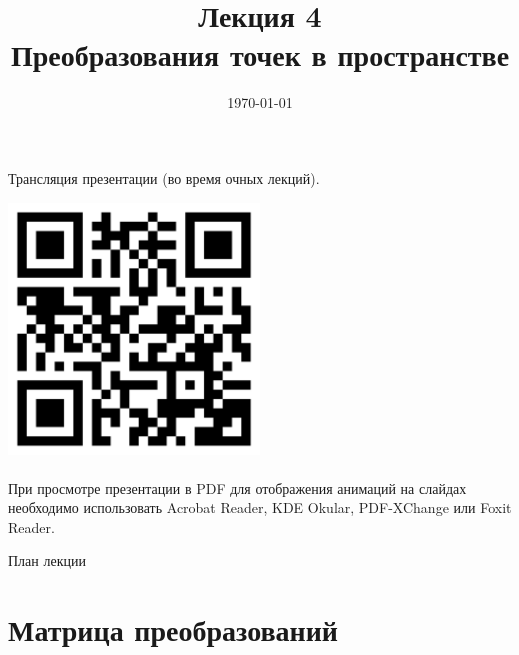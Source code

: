 \documentclass[10pt]{beamer}
\date{\today}
\title{Лекция 4 \\Преобразования точек в пространстве}
\begin{document}
 		 

    
    \begin{frame}[plain]
    	
    	
    	\centering
    	Трансляция презентации (во время очных лекций).     
    		
    	\includegraphics[width=0.5\textwidth, keepaspectratio]{qr.png} \\ ~ \\
    	
    	
    	При просмотре презентации в PDF для отображения анимаций на слайдах необходимо использовать Acrobat Reader, KDE Okular, PDF-XChange или Foxit Reader.

    \end{frame}
	
	
	\frame{\maketitle}
	
	
	
	\begin{frame}{План лекции}
		\tableofcontents
	\end{frame}
	
	
	
	\section{Матрица преобразований}
	
	\frame{\sectionpage}
	
\end{document}
